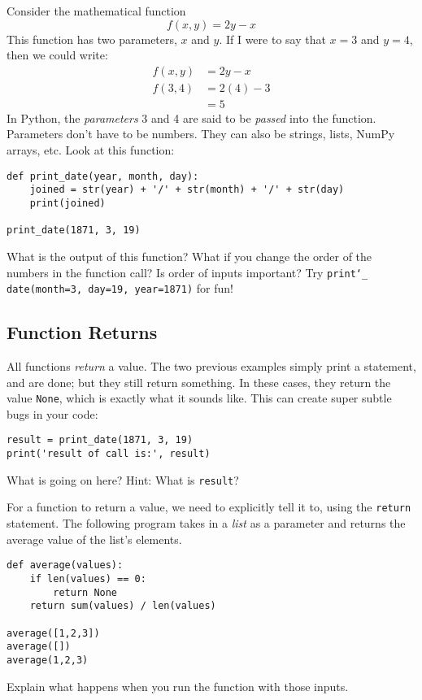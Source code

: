 \documentclass[]{article}
\renewcommand{\_}{\char`_}
\begin{document}
Consider the mathematical function $$f(x,y) = 2y-x$$ This function has two parameters, $x$ and $y$. If I were to say that $x=3$ and $y=4$, then we could write: 
\begin{align*}
f(x,y) &= 2y-x\\
f(3,4) &= 2(4)-3\\
&=5
\end{align*}
In Python, the \textit{parameters} 3 and 4 are said to be \textit{passed} into the function. Parameters don't have to be numbers. They can also be strings, lists, NumPy arrays, etc. Look at this function: 
\begin{lstlisting}
def print_date(year, month, day):
    joined = str(year) + '/' + str(month) + '/' + str(day)
    print(joined)

print_date(1871, 3, 19)
\end{lstlisting}
What is the output of this function? What if you change the order of the numbers in the function call? Is order of inputs important? Try \texttt{print\_ date(month=3, day=19, year=1871)} for fun! 

\medskip\makebox[0.96\textwidth]{\hrulefill}

\medskip\makebox[0.96\textwidth]{\hrulefill}

\medskip\makebox[0.96\textwidth]{\hrulefill}

\subsection{Function Returns}

All functions \textit{return} a value. The two previous examples simply print a statement, and are done; but they still return something. In these cases, they return the value \texttt{None}, which is exactly what it sounds like. This can create super subtle bugs in your code:
\begin{lstlisting}
result = print_date(1871, 3, 19)
print('result of call is:', result)
\end{lstlisting}
What is going on here? Hint: What is \texttt{result}? 

\medskip\makebox[0.96\textwidth]{\hrulefill}

\medskip\makebox[0.96\textwidth]{\hrulefill}

\medskip\makebox[0.96\textwidth]{\hrulefill}

For a function to return a value, we need to explicitly tell it to, using the \texttt{return} statement. The following program takes in a \textit{list} as a parameter and returns the average value of the list's elements. 
\begin{lstlisting}
def average(values):
    if len(values) == 0:
        return None
    return sum(values) / len(values)

average([1,2,3])
average([])
average(1,2,3)
\end{lstlisting}
Explain what happens when you run the function with those inputs. 
\end{document}
